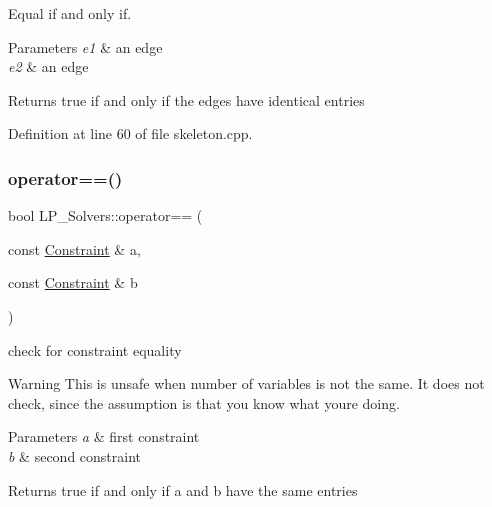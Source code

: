 Equal if and only if. 


\begin{DoxyParams}{Parameters}
{\em e1} & an edge \\
\hline
{\em e2} & an edge \\
\hline
\end{DoxyParams}
\begin{DoxyReturn}{Returns}
{\ttfamily true} if and only if the edges have identical entries 
\end{DoxyReturn}


Definition at line 60 of file skeleton.\+cpp.

\mbox{\label{namespace_l_p___solvers_ac547de44c030843952f4dd715accaf1d}} 
\subsubsection{\texorpdfstring{operator==()}{operator==()}\hspace{0.1cm}{\footnotesize\ttfamily [2/3]}}
{\footnotesize\ttfamily bool L\+P\+\_\+\+Solvers\+::operator== (\begin{DoxyParamCaption}\item[{const \hyperlink{group___c_l_s_solvers_class_l_p___solvers_1_1_constraint}{Constraint} \&}]{a,  }\item[{const \hyperlink{group___c_l_s_solvers_class_l_p___solvers_1_1_constraint}{Constraint} \&}]{b }\end{DoxyParamCaption})}



check for constraint equality 

\begin{DoxyWarning}{Warning}
This is unsafe when number of variables is not the same. It does not check, since the assumption is that you know what you\textquotesingle{}re doing. 
\end{DoxyWarning}

\begin{DoxyParams}{Parameters}
{\em a} & first constraint \\
\hline
{\em b} & second constraint \\
\hline
\end{DoxyParams}
\begin{DoxyReturn}{Returns}
{\ttfamily true} if and only if {\ttfamily a} and {\ttfamily b} have the same entries 
\end{DoxyReturn}


